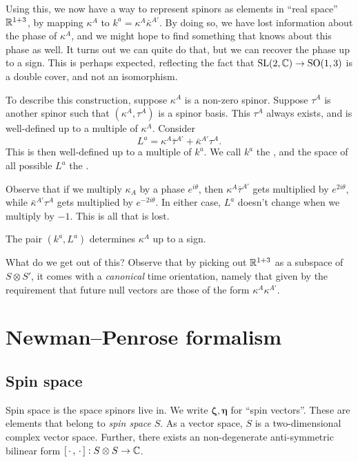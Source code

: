 \documentclass[a4paper]{article}
\begin{document}
Using this, we now have a way to represent spinors as elements in ``real space'' $\mathbb{R}^{1 + 3}$, by mapping $\kappa^A$ to $k^a = \kappa^A \bar{\kappa}^{A'}$. By doing so, we have lost information about the phase of $\kappa^A$, and we might hope to find something that knows about this phase as well. It turns out we can quite do that, but we can recover the phase up to a sign. This is perhaps expected, reflecting the fact that $\mathrm{SL}(2, \mathbb{C}) \to \mathrm{SO}(1, 3)$ is a double cover, and not an isomorphism.

To describe this construction, suppose $\kappa^A$ is a non-zero spinor. Suppose $\tau^A$ is another spinor such that $(\kappa^A, \tau^A)$ is a spinor basis. This $\tau^A$ always exists, and is well-defined up to a multiple of $\kappa^A$. Consider
\[
  L^a = \kappa^A \bar{\tau}^{A'} + \bar{\kappa}^{A'} \tau^A.
\]
This is then well-defined up to a multiple of $k^a$. We call $k^a$ the , and the space of all possible $L^a$ the .

Observe that if we multiply $\kappa_A$ by a phase $e^{i\theta}$, then $\kappa^A \bar{\tau}^{A'}$ gets multiplied by $e^{2i\theta}$, while $\bar{\kappa}^{A'} \tau^A$ gets multiplied by $e^{-2i\theta}$. In either case, $L^a$ doesn't change when we multiply by $-1$. This is all that is lost.

\begin{lemma}
  The pair $(k^a, L^a)$ determines $\kappa^A$ up to a sign. %
\end{lemma}

What do we get out of this? Observe that by picking out $\mathbb{R}^{1 + 3}$ as a subspace of $S \otimes S'$, it comes with a \emph{canonical} time orientation, namely that given by the requirement that future null vectors are those of the form $\kappa^A \kappa^{A'}$.

\section{Newman--Penrose formalism}
\subsection{Spin space}
Spin space is the space spinors live in. We write $\boldsymbol\zeta, \boldsymbol\eta$ for ``spin vectors''. These are elements that belong to \emph{spin space} $S$. As a vector space, $S$ is a two-dimensional complex vector space. Further, there exists an non-degenerate anti-symmetric bilinear form $[\,\cdot\,, \,\cdot\,]: S \otimes S \to \mathbb{C}$.
\end{document}
